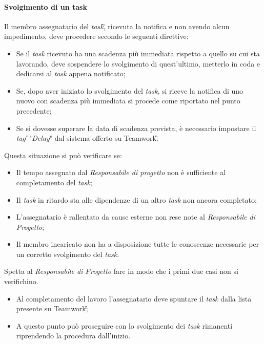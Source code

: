 \paragraph{Svolgimento di un task}
Il membro assegnatario del \textit{task}\G, ricevuta la notifica e non avendo alcun impedimento, deve procedere secondo le seguenti direttive:
\begin{itemize}
\item Se il \textit{task} ricevuto ha una scadenza più immediata rispetto a quello su cui sta lavorando, deve sospendere lo svolgimento di quest'ultimo, metterlo in coda e dedicarsi al \textit{task} appena notificato;
\item Se, dopo aver iniziato lo svolgimento del \textit{task}, si riceve la notifica di uno nuovo con scadenza più immediata si procede come riportato nel punto precedente;
\item Se si dovesse superare la data di scadenza prevista, è necessario impostare il \textit{tag}\G\ "\textit{Delay}" dal sistema offerto su Teamwork\G.
\end{itemize}{}
Questa situazione si può verificare se:
\begin{itemize}
\item Il tempo assegnato dal \textit{Responsabile di progetto} non è sufficiente al completamento del \textit{task};
\item Il \textit{task} in ritardo sta alle dipendenze di un altro \textit{task} non ancora completato;
\item L'assegnatario è rallentato da cause esterne non rese note al \textit{Responsabile di Progetto};
\item Il membro incaricato non ha a disposizione tutte le conoscenze necessarie per un corretto svolgimento del \textit{task}.\\
\end{itemize}
Spetta al \textit{Responsabile di Progetto} fare in modo che i primi due casi non si verifichino.
\begin{itemize}
\item Al completamento del lavoro l'assegnatario deve spuntare il \textit{task} dalla lista presente su Teamwork\G;
\item A questo punto può proseguire con lo svolgimento dei \textit{task} rimanenti riprendendo la procedura dall'inizio.
\end{itemize}

